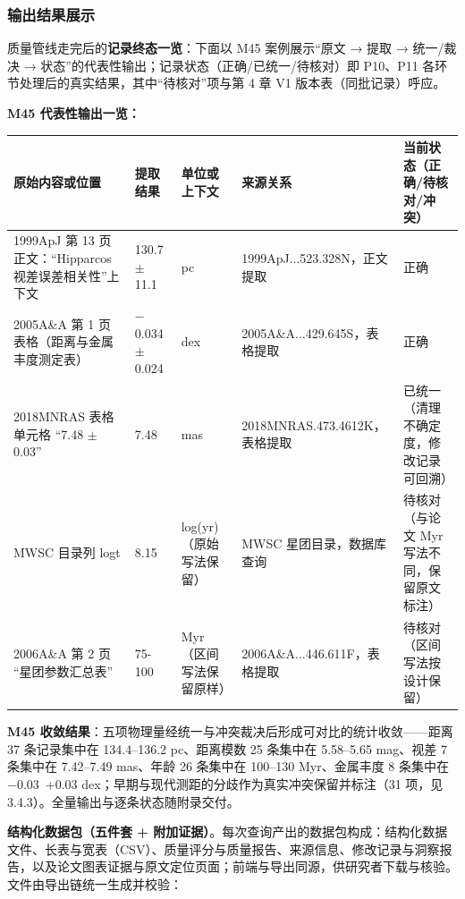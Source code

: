 \subsubsection{输出结果展示}

质量管线走完后的\textbf{记录终态一览}：下面以 M45 案例展示“原文 → 提取 → 统一/裁决 → 状态”的代表性输出；记录状态（正确/已统一/待核对）即 P10、P11 各环节处理后的真实结果，其中“待核对”项与第 4 章 V1 版本表（同批记录）呼应。

\noindent\textbf{M45 代表性输出一览：}

\begin{longtable}{@{}p{3.4cm}p{2.3cm}p{2.6cm}p{3.0cm}p{2.4cm}@{}}
\toprule
原始内容或位置 & 提取结果 & 单位或上下文 & 来源关系 & 当前状态（正确/待核对/冲突） \\
\midrule
1999ApJ 第 13 页正文：“Hipparcos 视差误差相关性”上下文 & 130.7 $\pm$ 11.1 & pc & 1999ApJ...523.328N，正文提取 & 正确 \\
2005A\&A 第 1 页表格（距离与金属丰度测定表） & $-$0.034 $\pm$ 0.024 & dex & 2005A\&A...429.645S，表格提取 & 正确 \\
2018MNRAS 表格单元格 “7.48 $\pm$ 0.03” & 7.48 & mas & 2018MNRAS.473.4612K，表格提取 & 已统一（清理不确定度，修改记录可回溯） \\
MWSC 目录列 logt & 8.15 & log(yr)（原始写法保留） & MWSC 星团目录，数据库查询 & 待核对（与论文 Myr 写法不同，保留原文标注） \\
2006A\&A 第 2 页 “星团参数汇总表” & 75-100 & Myr（区间写法保留原样） & 2006A\&A...446.611F，表格提取 & 待核对（区间写法按设计保留） \\
\bottomrule
\end{longtable}

\noindent\textbf{M45 收敛结果}：五项物理量经统一与冲突裁决后形成可对比的统计收敛——距离 37 条记录集中在 134.4--136.2 pc、距离模数 25 条集中在 5.58--5.65 mag、视差 7 条集中在 7.42--7.49 mas、年龄 26 条集中在 100--130 Myr、金属丰度 8 条集中在 $-$0.03~+0.03 dex；早期与现代测距的分歧作为真实冲突保留并标注（31 项，见 3.4.3）。全量输出与逐条状态随附录交付。

\bigskip
\noindent\textbf{结构化数据包（五件套 + 附加证据）}。每次查询产出的数据包构成：结构化数据文件、长表与宽表（CSV）、质量评分与质量报告、来源信息、修改记录与洞察报告，以及论文图表证据与原文定位页面；前端与导出同源，供研究者下载与核验。文件由导出链统一生成并校验：

